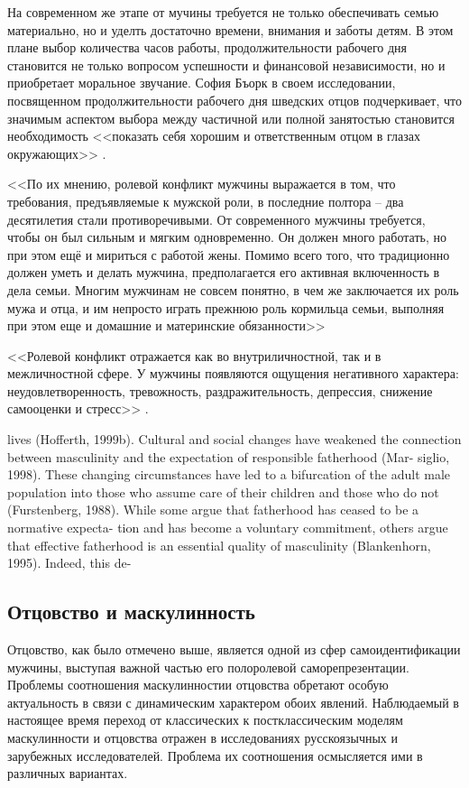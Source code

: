 \documentclass{../../common/thesisbyxetex}
\begin{document}
На современном же этапе от мучины требуется не только обеспечивать семью материально, но и уделть 
достаточно времени, внимания и заботы детям. В этом плане выбор количества часов работы, 
продолжительности рабочего дня становится не только вопросом успешности и финансовой независимости, 
но и приобретает моральное звучание. София Бъорк в своем исследовании, посвященном  
продолжительности рабочего дня шведских отцов подчеркивает, что значимым аспектом  выбора 
между частичной или полной занятостью становится необходимость <<показать себя хорошим и 
ответственным отцом в глазах окружающих>> \cite[221]{morfat}.


<<По их мнению, ролевой конфликт мужчины выражается в том,
что требования, предъявляемые к мужской роли, в последние полтора – два десятилетия
стали противоречивыми. От современного мужчины требуется, чтобы он был сильным и
мягким одновременно. Он должен много работать, но при этом ещё и мириться с работой
жены. Помимо всего того, что традиционно должен уметь и делать мужчина,
предполагается его активная включенность в дела семьи. Многим мужчинам не совсем
понятно, в чем же заключается их роль мужа и отца, и им непросто играть прежнюю роль
кормильца семьи, выполняя при этом еще и домашние и материнские обязанности>> \cite[112]{confl}


<<Ролевой конфликт отражается как во внутриличностной, так и в межличностной
сфере. У мужчины появляются ощущения негативного характера: неудовлетворенность,
тревожность, раздражительность, депрессия, снижение самооценки и стресс>> \cite[113]{confl}.



lives (Hofferth, 1999b). Cultural and social changes
have weakened the connection between masculinity
and the expectation of responsible fatherhood (Mar-
siglio, 1998). These changing circumstances have led
to a bifurcation of the adult male population into
those who assume care of their children and those
who do not (Furstenberg, 1988). While some argue
that fatherhood has ceased to be a normative expecta-
tion and has become a voluntary commitment, others
argue that effective fatherhood is an essential quality
of masculinity (Blankenhorn, 1995). Indeed, this de-
\cite[132]{f21}

\subsection{Отцовство и маскулинность}

Отцовство, как было отмечено выше, является одной из сфер самоидентификации мужчины, выступая
важной частью его полоролевой саморепрезентации. Проблемы соотношения маскулинностии отцовства
обретают особую актуальность в связи с динамическим характером обоих явлений. Наблюдаемый в
настоящее время переход от классических к постклассическим моделям маскулинности и отцовства
отражен в исследованиях русскоязычных и зарубежных исследователей. Проблема их соотношения
осмысляется ими в различных вариантах.
\end{document}
